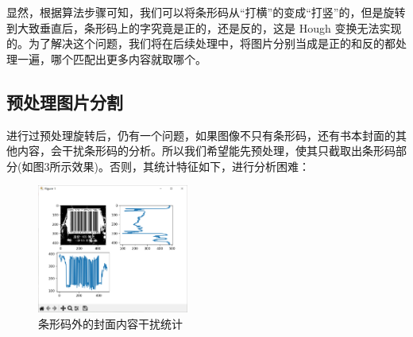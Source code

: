 \documentclass{ctexart}
\begin{document}
显然，根据算法步骤可知，我们可以将条形码从“打横”的变成“打竖”的，但是旋转到大致垂直后，条形码上的字究竟是正的，还是反的，这是 Hough 变换无法实现的。为了解决这个问题，我们将在后续处理中，将图片分别当成是正的和反的都处理一遍，哪个匹配出更多内容就取哪个。

\subsection{预处理图片分割}
进行过预处理旋转后，仍有一个问题，如果图像不只有条形码，还有书本封面的其他内容，会干扰条形码的分析。所以我们希望能先预处理，使其只截取出条形码部分(如图3所示效果)。否则，其统计特征如下，进行分析困难：
\begin{figure}[H]
    \centering
    \includegraphics[height=120pt]{isbn_beforeCut}
    \caption{条形码外的封面内容干扰统计}
\end{figure}

\end{document}
